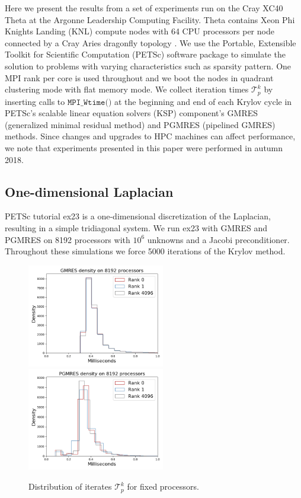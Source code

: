 \documentclass[sigconf, anonymous]{acmart}
\begin{document}
Here we present the results from a set of experiments run on the Cray XC40 Theta at the Argonne Leadership Computing Facility. 
Theta contains Xeon Phi Knights Landing (KNL) compute nodes \cite{sodani2015knights} with 64 CPU processors per node connected by a Cray Aries dragonfly topology \cite{alverson2012cray}.
We use the Portable, Extensible Toolkit for Scientific Computation (PETSc) \cite{balay2017petsc, balay2001petsc} software package to simulate the solution to problems with varying characteristics such as sparsity pattern. 
One MPI rank per core is used throughout and we boot the nodes in quadrant clustering mode with flat memory mode. 
We collect iteration times $\mathcal{T}^k_p$ by inserting calls to ${\texttt{MPI\_Wtime()}}$ at the beginning and end of each Krylov cycle in PETSc's scalable linear equation solvers (KSP) component's GMRES (generalized minimal residual method) and PGMRES (pipelined GMRES) methods. 
Since changes and upgrades to HPC machines can affect performance, we note that experiments presented in this paper were performed in autumn 2018. 


\subsection{One-dimensional Laplacian} \label{sec:ex23}
PETSc tutorial ex23 is a one-dimensional discretization of the Laplacian, resulting in a simple tridiagonal system. 
We run ex23 with GMRES and PGMRES on 8192 processors with $10^6$ unknowns and a Jacobi preconditioner. 
Throughout these simulations we force 5000 iterations of the Krylov method.


\begin{figure}[t]
\centering
\includegraphics[width=6cm]{../plots/GMRES_ex23_8192_1000000_identical_in_p.png}
\includegraphics[width=6cm]{../plots/PGMRES_ex23_8192_1000000_identical_in_p.png}
\caption{Distribution of iterates $\mathcal{T}^k_p$ for fixed processors.} \label{fig:ex23-identical}
\end{figure}
\end{document}
